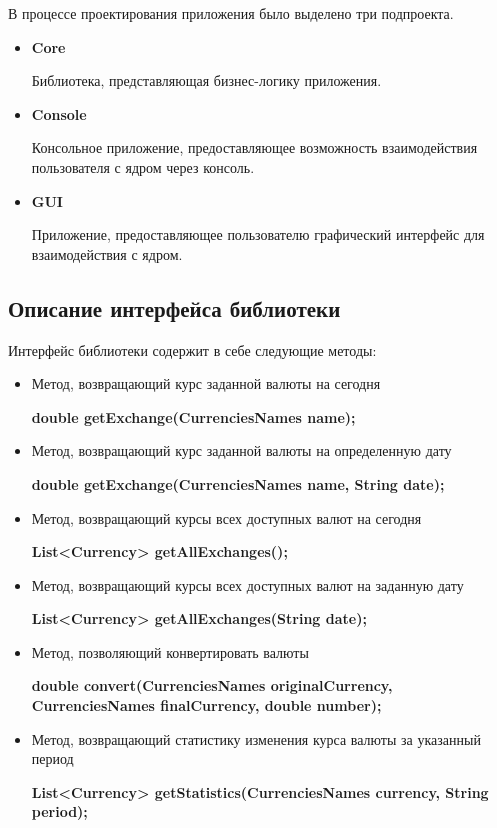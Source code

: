 \documentclass[a4paper]{article}
\begin{document}
В процессе проектирования приложения было выделено три подпроекта.

\begin{itemize}

\item \textbf{Core}

Библиотека, представляющая бизнес-логику приложения.

\item \textbf{Console}

Консольное приложение, предоставляющее возможность взаимодействия пользователя с ядром через консоль.

\item \textbf{GUI}

Приложение, предоставляющее пользователю графический интерфейс для взаимодействия с ядром.

\end{itemize}

\subsection{Описание интерфейса библиотеки}

Интерфейс библиотеки содержит в себе следующие методы:

\begin{itemize}

\item Метод, возвращающий курс заданной валюты на сегодня

\textbf{double getExchange(CurrenciesNames name);}

\item Метод, возвращающий курс заданной валюты на определенную дату

\textbf{double getExchange(CurrenciesNames name, String date);}

\item Метод, возвращающий курсы всех доступных валют на сегодня

\textbf{List<Currency> getAllExchanges();}

\item Метод, возвращающий курсы всех доступных валют на заданную дату

\textbf{List<Currency> getAllExchanges(String date);}

\item Метод, позволяющий конвертировать валюты

\textbf{double convert(CurrenciesNames originalCurrency, CurrenciesNames finalCurrency, double number);}

\item Метод, возвращающий статистику изменения курса валюты за указанный период

\textbf{List<Currency> getStatistics(CurrenciesNames currency, String period);}

\end{itemize}
\end{document}
